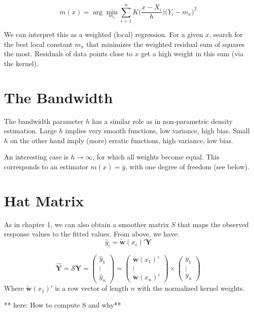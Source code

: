 \documentclass[]{book}
\begin{document}
\[ m(x) = \arg\min\limits_{m_x} \sum\limits_{i = 1}^nK\Big(\frac{x-X_i}{h}\Big)\big(Y_i-m_x\big)^2 \]

We can interpret this as a weighted (local) regression. For a given
\(x\), search for the best local constant \(m_x\) that minimizes the
weighted residual sum of squares the most. Residuals of data points
close to \(x\) get a high weight in this sum (via the kernel).

\section{The Bandwidth}\label{the-bandwidth-1}

The bandwidth parameter \(h\) has a similar role as in non-parametric
density estimation. Large \(h\) implies very smooth functions, low
variance, high bias. Small \(h\) on the other hand imply (more) erratic
functions, high variance, low bias.

An interesting case is \(h \rightarrow \infty\), for which all weights
become equal. This corresponds to an estimator \(m(x) = \bar{y}\), with
one degree of freedom (see below).

\section{Hat Matrix}\label{hat-matrix-1}

As in chapter 1, we can also obtain a smoother matrix \(S\) that maps
the observed response values to the fitted values. From above, we have:
\[\hat{y}_i = \tilde{\mathbf{w}}(x_i)'\mathbf{Y}\]

\[\mathbf{\hat{Y}} = \mathcal{S} \mathbf{Y} = 
\begin{pmatrix}\hat{y}_1 \\\vdots\\\hat{y}_n\end{pmatrix} =
\begin{pmatrix}\tilde{\mathbf{w}}(x_1)'\\\vdots\\\tilde{\mathbf{w}}(x_n)'\end{pmatrix} 
\times \begin{pmatrix}y_1 \\\vdots\\y_n\end{pmatrix}\] Where
\(\tilde{\mathbf{w}}(x_1)'\) is a row vector of length \(n\) with the
normalized kernel weights.

** here: How to compute S and why**
\end{document}
